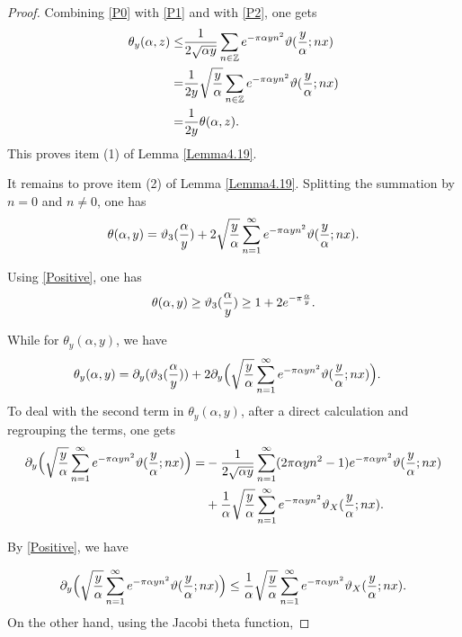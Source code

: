 \documentclass[reqno,english]{amsart}
\newtheorem{open problem}{Open Problem}[section]
\newtheorem{open question}{Open Question}[section]
\newtheorem{open questions on hexagonal lattice}{Open Questions on hexagonal lattice}[section]
\begin{document}
\begin{proof}
Combining \eqref{P0} with \eqref{P1} and with \eqref{P2}, one gets
 \begin{equation}\aligned\nonumber
\theta_y(\alpha,z)\leq&\frac{1}{2\sqrt{\alpha y}}\sum_{n\in\mathbb{Z}} e^{-\pi\alpha yn^2}\vartheta(\frac{y}{\alpha};nx)\\
=&\frac{1}{2y}\sqrt{\frac{y}{\alpha}}\sum_{n\in\mathbb{Z}} e^{-\pi\alpha yn^2}\vartheta(\frac{y}{\alpha};nx)\\
=&\frac{1}{2y}\theta(\alpha,z).
 \endaligned\end{equation}
This proves item (1) of Lemma \ref{Lemma4.19}.

It remains to prove item (2) of Lemma \ref{Lemma4.19}.
Splitting the summation by $n=0$ and $n\neq0$, one has
 \begin{equation}\aligned\nonumber
\theta(\alpha,y)=\vartheta_3(\frac{\alpha}{y})+2\sqrt\frac{y}{\alpha}\sum_{n=1}^\infty e^{-\pi\alpha yn^2}\vartheta(\frac{y}{\alpha};nx).
 \endaligned\end{equation}


Using \eqref{Positive}, one has
 \begin{equation}\aligned\label{Theta0}
\theta(\alpha,y)\geq\vartheta_3(\frac{\alpha}{y})
\geq 1+2e^{-\pi\frac{\alpha}{y}}.
 \endaligned\end{equation}


While for $\theta_y(\alpha,y)$, we have
 \begin{equation}\aligned\label{C0}
\theta_y(\alpha,y)&=\partial_y(\vartheta_3(\frac{\alpha}{y}))+2\partial_y\Big(\sqrt\frac{y}{\alpha}\sum_{n=1}^\infty e^{-\pi\alpha yn^2}\vartheta(\frac{y}{\alpha};nx)\Big).
 \endaligned\end{equation}
To deal with the second term in $\theta_y(\alpha,y)$, after a direct calculation and regrouping the terms, one gets
 \begin{equation}\aligned\nonumber
\partial_y\Big(\sqrt\frac{y}{\alpha}\sum_{n=1}^\infty e^{-\pi\alpha yn^2}\vartheta(\frac{y}{\alpha};nx)\Big)
=&-\frac{1}{2\sqrt{\alpha y}}\sum_{n=1}^\infty (2\pi\alpha yn^2-1)e^{-\pi\alpha yn^2}\vartheta(\frac{y}{\alpha};nx)\\
&+\frac{1}{\alpha}\sqrt\frac{y}{\alpha}\sum_{n=1}^\infty e^{-\pi\alpha yn^2}\vartheta_X(\frac{y}{\alpha};nx).
 \endaligned\end{equation}

 By \eqref{Positive}, we have



  \begin{equation}\aligned\label{C1}
\partial_y\Big(\sqrt\frac{y}{\alpha}\sum_{n=1}^\infty e^{-\pi\alpha yn^2}\vartheta(\frac{y}{\alpha};nx)\Big)
\leq\frac{1}{\alpha}\sqrt\frac{y}{\alpha}\sum_{n=1}^\infty e^{-\pi\alpha yn^2}\vartheta_X(\frac{y}{\alpha};nx).
 \endaligned\end{equation}
 On the other hand, using the Jacobi theta function,


\end{proof}
\end{document}
